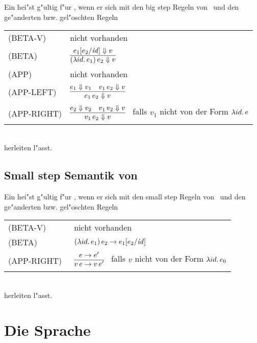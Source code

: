 Ein  hei"st g"ultig f"ur \LZEROCBN, wenn er sich mit den big step Regeln von \LZERO\ und den ge"anderten bzw. gel"oschten Regeln\\[5mm]
  \begin{tabular}{ll}
     \mbox{(BETA-V)}      & nicht vorhanden \\[3mm]
     \mbox{(BETA)}        & $\regel{e_1[e_2/\id] \eval v}
                                   {(\abstr{id}{e_1})\,e_2 \eval v}$ \\[5mm]
     \mbox{(APP)}         & nicht vorhanden \\[3mm]
     \mbox{(APP-LEFT)}    & $\regel{e_1 \eval v_1 \quad v_1\,e_2 \eval v}
                                   {e_1\,e_2 \eval v}$ \\[3mm]
     \mbox{(APP-RIGHT)}   & $\regel{e_2 \eval v_2 \quad v_1\,v_2 \eval v}
                                   {v_1\,e_2 \eval v}$   \ 
                                   falls ${v_1}$ nicht von der Form $\lambda id.\,e$
  \end{tabular}\\[7mm]
herleiten l"asst.


\subsection{Small step Semantik von \LZEROCBN}

Ein  hei"st g"ultig f"ur \LZEROCBN, wenn er sich mit den small step Regeln von \LZERO\ 
und den ge"anderten bzw. gel"oschten Regeln\\[5mm]
  \begin{tabular}{ll}
     \mbox{(BETA-V)}      & nicht vorhanden \\[3mm]
     \mbox{(BETA)}        & $(\lambda id.\,e_1)\,e_2 \to e_1[e_2/{\text{\it id\/}}]$ \\[5mm]
     \mbox{(APP-RIGHT)\ } & $\regel{e \to e'}
                                   {v\,e \to v\,e'}$   \ 
                                   falls ${v}$ nicht von der Form $\lambda id.\,e_0$
  \end{tabular}\\[7mm]
herleiten l"asst.



\section{Die Sprache \LONE}

